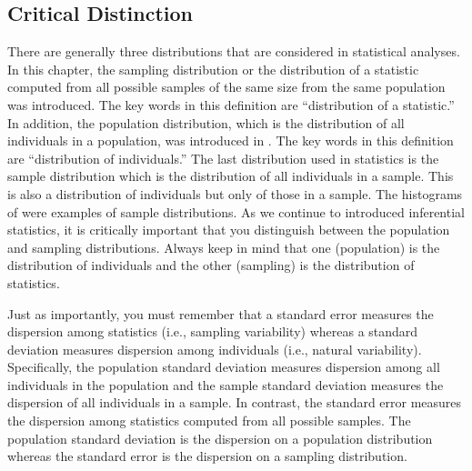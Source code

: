 \documentclass[10pt,openany]{book}\usepackage[]{graphicx}\usepackage[]{color}
\begin{document}
\subsection{Critical Distinction}
There are generally three distributions that are considered in statistical analyses.  In this chapter, the sampling distribution or the distribution of a statistic computed from all possible samples of the same size from the same population was introduced.  The key words in this definition are ``distribution of a statistic.''  In addition, the population distribution, which is the distribution of all individuals in a population, was introduced in .  The key words in this definition are ``distribution of individuals.''  The last distribution used in statistics is the sample distribution which is the distribution of all individuals in a sample.  This is also a distribution of individuals but only of those in a sample.  The histograms of  were examples of sample distributions.  As we continue to introduced inferential statistics, it is critically important that you distinguish between the population and sampling distributions.  Always keep in mind that one (population) is the distribution of individuals and the other (sampling) is the distribution of statistics.

Just as importantly, you must remember that a standard error measures the dispersion among statistics (i.e., sampling variability) whereas a standard deviation measures dispersion among individuals (i.e., natural variability).  Specifically, the population standard deviation measures dispersion among all individuals in the population and the sample standard deviation measures the dispersion of all individuals in a sample.  In contrast, the standard error measures the dispersion among statistics computed from all possible samples.  The population standard deviation is the dispersion on a population distribution whereas the standard error is the dispersion on a sampling distribution.

\end{document}
